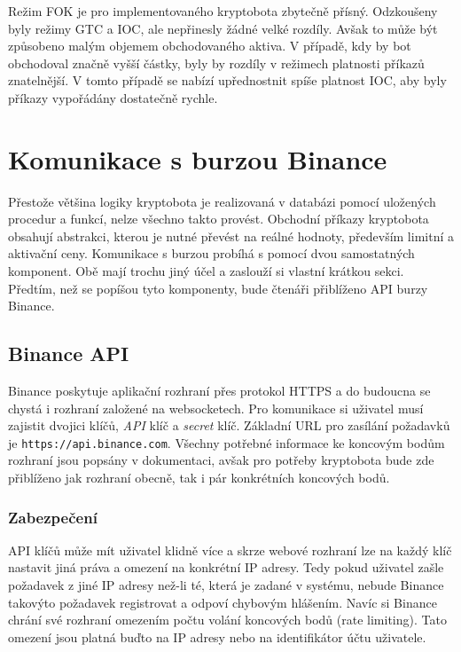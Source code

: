 Režim FOK je pro implementovaného kryptobota zbytečně přísný. Odzkoušeny byly režimy GTC a IOC, ale nepřinesly žádné velké rozdíly. Avšak to může být způsobeno malým objemem obchodovaného aktiva.
V případě, kdy by bot obchodoval značně vyšší částky, byly by rozdíly v režimech platnosti příkazů znatelnější. V tomto případě se nabízí upřednostnit spíše platnost IOC, aby byly příkazy
vypořádány dostatečně rychle.

\section{Komunikace s burzou Binance}
\label{subsec:exchanges-comm}
Přestože většina logiky kryptobota je realizovaná v databázi pomocí uložených procedur a funkcí, nelze všechno takto provést. Obchodní příkazy kryptobota obsahují abstrakci, kterou je
nutné převést na reálné hodnoty, především limitní a aktivační ceny. Komunikace s burzou probíhá s pomocí dvou samostatných komponent. Obě mají trochu jiný účel a zaslouží si vlastní krátkou sekci.
Předtím, než se popíšou tyto komponenty, bude čtenáři přiblíženo API burzy Binance.

\subsection{Binance API}
Binance poskytuje aplikační rozhraní přes protokol HTTPS a do budoucna se chystá i rozhraní založené na websocketech.
Pro komunikace si uživatel musí zajistit dvojici klíčů, \emph{API} klíč
a \emph{secret} klíč.
Základní URL pro zasílání požadavků je \verb|https://api.binance.com|.
Všechny potřebné informace ke koncovým bodům rozhraní jsou popsány v dokumentaci, avšak pro potřeby kryptobota bude zde přiblíženo jak rozhraní obecně, tak i pár konkrétních koncových bodů.

\subsubsection{Zabezpečení}
API klíčů může mít uživatel klidně více a skrze webové rozhraní lze na každý klíč nastavit jiná práva a omezení na konkrétní IP adresy. Tedy pokud uživatel zašle požadavek z jiné IP adresy než-li
té, která je zadané v systému, nebude Binance takovýto požadavek registrovat a odpoví chybovým hlášením. Navíc si Binance chrání své rozhraní omezením počtu volání koncových bodů (rate limiting). Tato omezení
jsou platná buďto na IP adresy nebo na identifikátor účtu uživatele.

